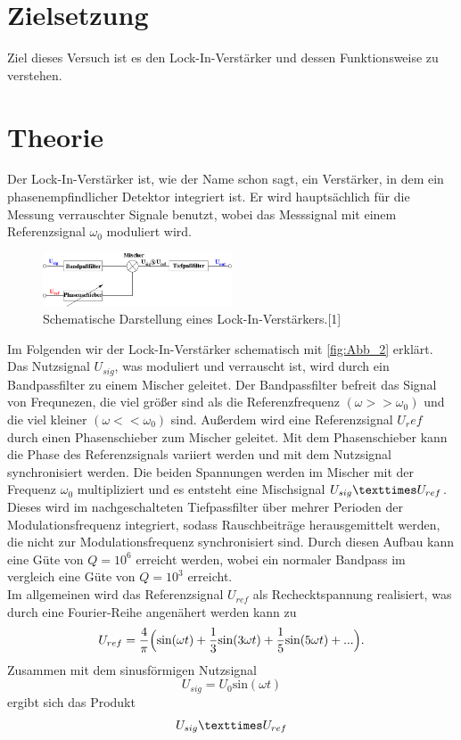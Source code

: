 \section{Zielsetzung}
\label{sec:Zielsetzung}
Ziel dieses Versuch ist es den Lock-In-Verstärker und dessen Funktionsweise zu verstehen.

\section{Theorie}
\label{sec:Theorie}
 Der Lock-In-Verstärker ist, wie der Name schon sagt, ein Verstärker, in dem ein phasenempfindlicher Detektor integriert ist.
 Er wird hauptsächlich für die Messung verrauschter Signale benutzt, wobei das Messsignal mit einem Referenzsignal $\omega_0$ moduliert wird.
 \begin{figure}[H]
    \centering
    \includegraphics[width=0.5\textwidth]{build/Abb_1.pdf}
    \caption {Schematische Darstellung eines Lock-In-Verstärkers.[1]\cite{v303}}
    \label{fig:Abb_1}
\end{figure}
Im Folgenden wir der Lock-In-Verstärker schematisch mit \autoref{fig:Abb_2} erklärt.
Das Nutzsignal $U_{sig}$, was moduliert und verrauscht ist, wird durch ein Bandpassfilter zu einem Mischer geleitet.
Der Bandpassfilter befreit das Signal von Frequnezen, die viel größer sind als die Referenzfrequenz $(\omega >> \omega_0)$ und die viel kleiner $(\omega << \omega_0)$ sind.
Außerdem wird eine Referenzsignal $U_ref$ durch einen Phasenschieber zum Mischer geleitet.
Mit dem Phasenschieber kann die Phase des Referenzsignals variiert werden und mit dem Nutzsignal synchronisiert werden.
Die beiden Spannungen werden im Mischer mit der Frequenz $\omega_0$ multipliziert und es entsteht eine Mischsignal $U_{sig} \texttimes U_{ref}$.
Dieses wird im nachgeschalteten Tiefpassfilter über mehrer Perioden der Modulationsfrequenz integriert, sodass Rauschbeiträge herausgemittelt werden, die nicht zur Modulationsfrequenz synchronisiert sind.
Durch diesen Aufbau kann eine Güte von $Q = 10^6$ erreicht werden, wobei ein normaler Bandpass im vergleich eine Güte von $Q=10^3$ erreicht.\\
Im allgemeinen wird das Referenzsignal $U_{ref}$ als Rechecktspannung realisiert, was durch eine Fourier-Reihe angenähert werden kann zu
\begin{equation}
    U_{ref} =\frac{4}{\pi}\Bigl( \text{sin}(\omega t) + \frac{1}{3}\text{sin}(3\omega t) + \frac{1}{5}\text{sin}(5\omega t) + ... \Bigr).
    \label{eqn:Referenzsignal}
\end{equation}
Zusammen mit dem sinusförmigen Nutzsignal
\begin{equation}
    U_{sig} = U_0 \text{sin}(\omega t)
    \label{eqn:Nutzsignal}
\end{equation}
ergibt sich das Produkt
\begin{equation}
    U_{sig} \texttimes U_{ref}
\end{equation}
